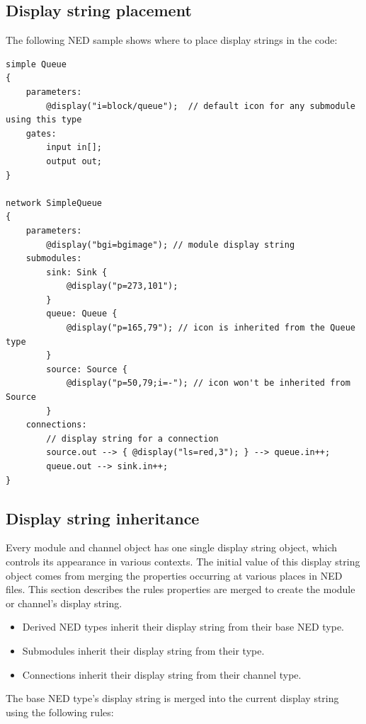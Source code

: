 \subsection{Display string placement}

The following NED sample shows where to place display strings in the code:

\begin{verbatim}
simple Queue
{
    parameters:
        @display("i=block/queue");  // default icon for any submodule using this type
    gates:
        input in[];
        output out;
}

network SimpleQueue
{
    parameters:
        @display("bgi=bgimage"); // module display string
    submodules:
        sink: Sink {
            @display("p=273,101");
        }
        queue: Queue {
            @display("p=165,79"); // icon is inherited from the Queue type
        }
        source: Source {
            @display("p=50,79;i=-"); // icon won't be inherited from Source
        }
    connections:
        // display string for a connection
        source.out --> { @display("ls=red,3"); } --> queue.in++;
        queue.out --> sink.in++;
}
\end{verbatim}

\subsection{Display string inheritance}

Every module and channel object has one single display string object,
which controls its appearance in various contexts. The initial value of
this display string object comes from merging the 
properties occurring at various places in NED files.
This section describes the rules  properties are merged
to create the module or channel's display string.

\begin{itemize}
  \item Derived NED types inherit their display string from their base NED type.
  \item Submodules inherit their display string from their type.
  \item Connections inherit their display string from their channel type.
\end{itemize}

The base NED type's display string is merged into the current display string
using the following rules:

